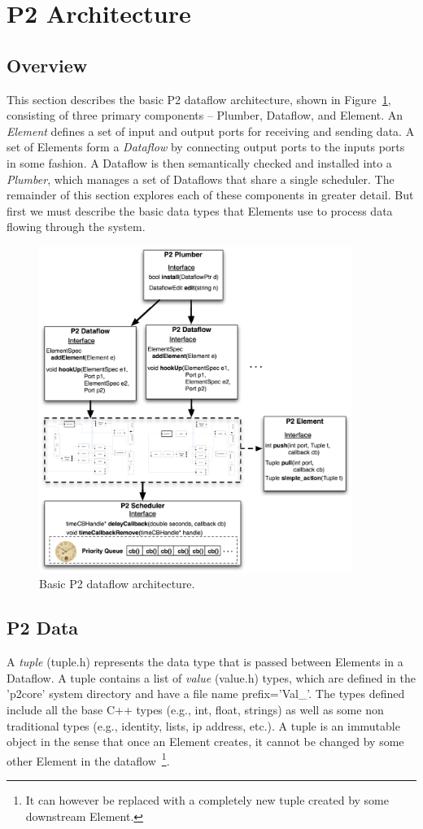 \documentclass[12pt]{article}
\begin{document}
\section{P2 Architecture}
\label{sec:basic}

\subsection{Overview}
This section describes the basic P2 dataflow architecture, shown in
Figure~\ref{fig:arch}, consisting of three primary components -- Plumber, 
Dataflow, and Element. An \emph{Element} defines a set of input and output 
ports for receiving and sending data. A set of
Elements form a \emph{Dataflow} by connecting output ports to the inputs ports
in some fashion. A Dataflow is then semantically checked and installed into a
\emph{Plumber}, which manages a set of Dataflows that share a single scheduler.
The remainder of this section explores each of these components in greater detail.
But first we must describe the basic data types that Elements use to process data
flowing through the system.

\begin{figure}[htbp] %
   \centering
   \includegraphics[width=4in]{dataflow_arch.eps} 
   \caption{Basic P2 dataflow architecture.}
   \label{fig:arch}
\end{figure}


\subsection{P2 Data}
A \emph{tuple} (tuple.h) represents the data type that is passed between Elements in a 
Dataflow. A tuple contains a list of \emph{value} (value.h) types, which are defined
in the 'p2core' system directory and have a file name prefix='Val\_'. The types defined
include all the base C++ types (e.g., int, float, strings) as well as some non traditional
types (e.g., identity, lists, ip address, etc.). A tuple is an immutable object in the sense
that once an Element creates, it cannot be changed by some other Element in the
dataflow~\footnote{It can however be replaced with a completely new tuple created by
some downstream Element.}. 
\end{document}
